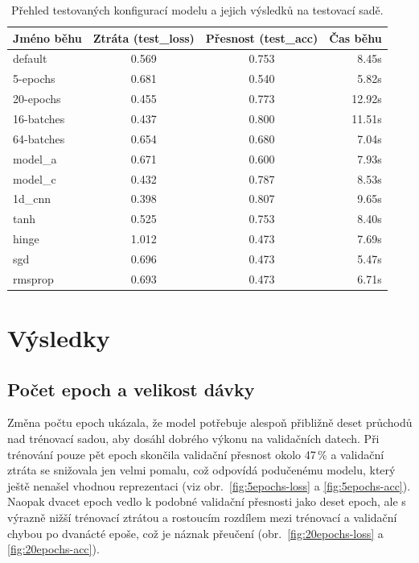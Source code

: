 \documentclass[a4paper,oneside,11pt,usenames,dvipsnames]{article}
\begin{document}
\begin{table}[ht]
\centering
\caption{Přehled testovaných konfigurací modelu a jejich výsledků na testovací sadě.\label{tab:configs}}
\begin{tabular}{@{}l|cc|r@{}}
\toprule
Jméno běhu & Ztráta (test\_loss) & Přesnost (test\_acc) & Čas běhu \\
\midrule
default    & 0.569 & 0.753 & 8.45s \\
5-epochs   & 0.681 & 0.540 & 5.82s \\
20-epochs  & 0.455 & 0.773 & 12.92s \\
16-batches & 0.437 & 0.800 & 11.51s \\
64-batches & 0.654 & 0.680 & 7.04s \\
model\_a   & 0.671 & 0.600 & 7.93s \\
model\_c   & 0.432 & 0.787 & 8.53s \\
1d\_cnn    & 0.398 & 0.807 & 9.65s \\
tanh       & 0.525 & 0.753 & 8.40s \\
hinge      & 1.012 & 0.473 & 7.69s \\
sgd        & 0.696 & 0.473 & 5.47s \\
rmsprop    & 0.693 & 0.473 & 6.71s \\
\bottomrule
\end{tabular}
\end{table}

\section{Výsledky}
\label{sec:vysledky}

\subsection{Počet epoch a velikost dávky}
\label{subsec:pocet-epoch-a-velikost-davky}
Změna počtu epoch ukázala, že model potřebuje alespoň přibližně deset průchodů nad trénovací sadou, aby dosáhl dobrého výkonu na validačních datech. Při trénování pouze pět epoch skončila validační přesnost okolo 47\,\% a validační ztráta se snižovala jen velmi pomalu, což odpovídá podučenému modelu, který ještě nenašel vhodnou reprezentaci (viz obr.~\ref{fig:5epochs-loss} a \ref{fig:5epochs-acc}). Naopak dvacet epoch vedlo k podobné validační přesnosti jako deset epoch, ale s výrazně nižší trénovací ztrátou a rostoucím rozdílem mezi trénovací a validační chybou po dvanácté epoše, což je náznak přeučení (obr.~\ref{fig:20epochs-loss} a \ref{fig:20epochs-acc}).
\end{document}
